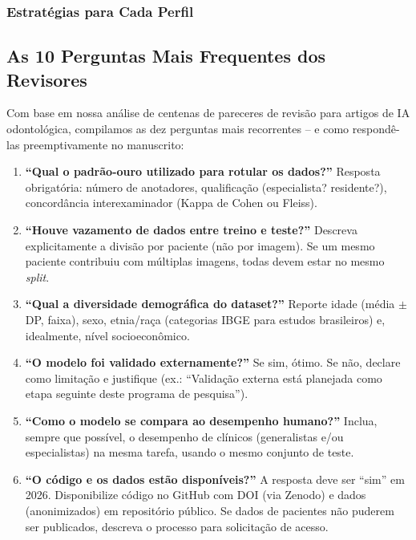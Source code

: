 \subsubsection{Estratégias para Cada Perfil}

\subsection{As 10 Perguntas Mais Frequentes dos Revisores}

Com base em nossa análise de centenas de pareceres de revisão para artigos de IA
odontológica, compilamos as dez perguntas mais recorrentes -- e como respondê-las
preemptivamente no manuscrito:

\begin{enumerate}
  \item \textbf{``Qual o padrão-ouro utilizado para rotular os dados?''}
    Resposta obrigatória: número de anotadores, qualificação (especialista?
    residente?), concordância interexaminador (Kappa de Cohen ou Fleiss).

  \item \textbf{``Houve vazamento de dados entre treino e teste?''}
    Descreva explicitamente a divisão por paciente (não por imagem). Se um mesmo
    paciente contribuiu com múltiplas imagens, todas devem estar no mesmo
    \textit{split}.

  \item \textbf{``Qual a diversidade demográfica do dataset?''}
    Reporte idade (média $\pm$ DP, faixa), sexo, etnia/raça (categorias IBGE
    para estudos brasileiros) e, idealmente, nível socioeconômico.

  \item \textbf{``O modelo foi validado externamente?''}
    Se sim, ótimo. Se não, declare como limitação e justifique (ex.: ``Validação
    externa está planejada como etapa seguinte deste programa de pesquisa'').

  \item \textbf{``Como o modelo se compara ao desempenho humano?''}
    Inclua, sempre que possível, o desempenho de clínicos (generalistas e/ou
    especialistas) na mesma tarefa, usando o mesmo conjunto de teste.

  \item \textbf{``O código e os dados estão disponíveis?''}
    A resposta deve ser ``sim'' em 2026. Disponibilize código no GitHub com DOI
    (via Zenodo) e dados (anonimizados) em repositório público. Se dados de
    pacientes não puderem ser publicados, descreva o processo para solicitação
    de acesso.


\end{enumerate}
